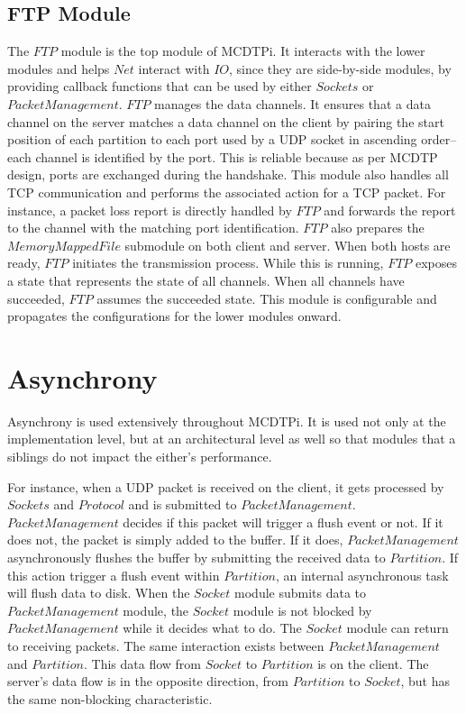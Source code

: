 \subsection{FTP Module}

The $FTP$ module is the top module of MCDTPi. It interacts with the lower modules and helps $Net$ interact with $IO$, since they are side-by-side modules, by providing callback functions that can be used by either $Sockets$ or $PacketManagement$. $FTP$ manages the data channels. It ensures that a data channel on the server matches a data channel on the client by pairing the start position of each partition to each port used by a UDP socket in ascending order--each channel is identified by the port. This is reliable because as per MCDTP design, ports are exchanged during the handshake. This module also handles all TCP communication and performs the associated action for a TCP packet. For instance, a packet loss report is directly handled by $FTP$ and forwards the report to the channel with the matching port identification. $FTP$ also prepares the $MemoryMappedFile$ submodule on both client and server. When both hosts are ready, $FTP$ initiates the transmission process. While this is running, $FTP$ exposes a state that represents the state of all channels. When all channels have succeeded, $FTP$ assumes the succeeded state. This module is configurable and propagates the configurations for the lower modules onward.

\section{Asynchrony}\label{sec:async-arch}

Asynchrony is used extensively throughout MCDTPi. It is used not only at the implementation level, but at an architectural level as well so that modules that a siblings do not impact the either's performance.

For instance, when a UDP packet is received on the client, it gets processed by $Sockets$ and $Protocol$ and is submitted to $PacketManagement$. $PacketManagement$ decides if this packet will trigger a flush event or not. If it does not, the packet is simply added to the buffer. If it does, $PacketManagement$ asynchronously flushes the buffer by submitting the received data to $Partition$. If this action trigger a flush event within $Partition$, an internal asynchronous task will flush data to disk. When the $Socket$ module submits data to $PacketManagement$ module, the $Socket$ module is not blocked by $PacketManagement$ while it decides what to do. The $Socket$ module can return to receiving packets. The same interaction exists between $PacketManagement$ and $Partition$. This data flow from $Socket$ to $Partition$ is on the client. The server's data flow is in the opposite direction, from $Partition$ to $Socket$, but has the same non-blocking characteristic.

